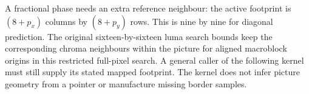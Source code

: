 A fractional phase needs an extra reference neighbour: the active footprint is
$(8+p_x)$ columns by $(8+p_y)$ rows. This is nine by nine for diagonal prediction.
The original sixteen-by-sixteen luma search bounds keep the corresponding chroma
neighbours within the picture for aligned macroblock origins in this restricted
full-pixel search. A general caller of the following kernel must still supply
its stated mapped footprint. The kernel does not infer picture geometry from a
pointer or manufacture missing border samples.
